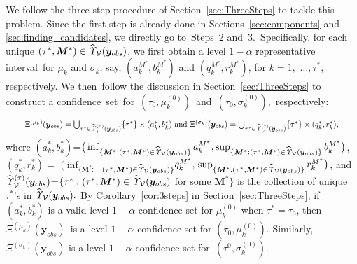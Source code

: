 \documentclass[12pt]{article}
\theoremstyle{shortspace}
\def\*#1{\bm{#1}}
\begin{document}
We follow the three-step procedure of Section~\ref{sec:ThreeSteps} to tackle this problem. Since the first step is already done in Sections~\ref{sec:components} and \ref{sec:finding_candidates}, we directly go to~Steps~2 and~3.~Specifically, for each unique $(\tau^*, \*M^*) \in \widehat{\it \Upsilon}_{{\mathcal V}}(\*y_{obs})$, we first obtain a level $1 - \alpha$ representative interval~for $\mu_k$ and $\sigma_k$, say, $(a_k^{M^*}, b_k^{M^*})$ and $(q_k^{M^*}, r_k^{M^*})$, for $k = 1, $ $\ldots, \tau^*$, respectively. 
We then~follow the discussion in Section~\ref{sec:ThreeSteps} to construct a confidence~set~for~$(\tau_0, \mu_k^{(0)})$~and~$(\tau_0, \sigma_k^{(0)})$,~respectively: 
\begin{equation}
\label{eq:cross_mix} 
\resizebox{.929\hsize}{!}{$\Xi^{(\mu_k)}(\*y_{obs}) = \bigcup\nolimits_{\tau^* \in \widehat{\it \Upsilon}^{(\tau)}_{{\mathcal V}}(\*y_{obs})}\{\tau^*\} \times (a^*_k, b^*_k) \hbox{ and }
\Xi^{(\sigma_k)}(\*y_{obs}) = \bigcup\nolimits_{\tau^* \in \widehat{\it \Upsilon}^{(\tau)}_{{\mathcal V}}(\*y_{obs})}\{\tau^*\} \times (q^*_k, r^*_k),$}
\end{equation}
where $(a_k^{*}, b_k^{*})$=$\big( \inf_{\{\*M^*: (\tau^*, \*M^*) 
 \in \widehat{\it \Upsilon}_{{\mathcal V}}(\*y_{obs}) \}}  a_k^{M^*},\allowbreak
\sup_{\{\*M^*: (\tau^*, \*M^*) 
\in \widehat{\it \Upsilon}_{{\mathcal V}}(\*y_{obs}) \}}b_k^{M^*}\big)$, $(q_k^{*}, r_k^{*}) = $ $\big(\inf_{\{\*M^*:}$ $_{(\tau^*, \*M^*) 
 \in \widehat{\it \Upsilon}_{{\mathcal V}}(\*y_{obs}) \}}  q_k^{M^*},  \, \sup_{\{\*M^*: (\tau^*, \*M^*) 
 \in \widehat{\it \Upsilon}_{{\mathcal V}}(\*y_{obs}) \}}r_k^{M^*}\big)$,
 and $\widehat{\it \Upsilon}^{(\tau)}_{{\mathcal V}}(\*y_{obs}) $=$\{\tau^*: (\tau^*, \*M^*) \in \widehat{\it \Upsilon}_{{\mathcal V}}(\*y_{obs})$ $ \mbox{for some }  \*M^*\}$ is the collection of unique $\tau^*$'s in $\widehat{\it \Upsilon}_{{\mathcal V}}(\*y_{obs}).$ 
 By Corollary~\ref{cor:3steps} in Section~\ref{sec:ThreeSteps}, if  
 $(a_k^{*}, b_k^{*})$ is a valid level $1 - \alpha$ confidence set for $\mu_k^{(0)}$ when $\tau^*=\tau_0$, 
then $\Xi^{(\mu_k)}(\*y_{obs})$~is a level $1 - \alpha$ confidence set for $(\tau_0,\mu_k^{(0)} ).$ Similarly,  $\Xi^{(\sigma_k)}(\*y_{obs})$ is a level $1 - \alpha$ confidence set for~$(\tau^0, \sigma_k^{(0)})$. 
\end{document}
